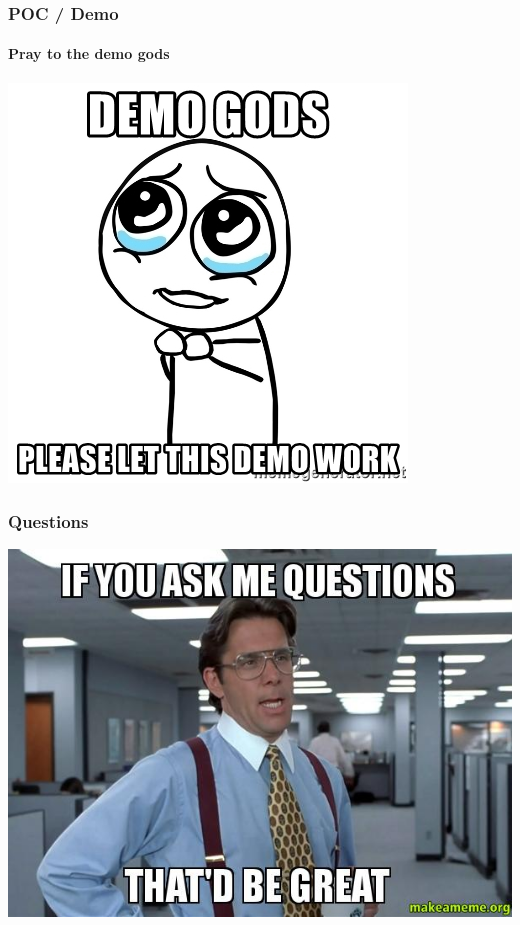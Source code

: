 \documentclass[aspectratio=169]{beamer}
\begin{document}
\begin{frame}
  \frametitle{POC / Demo}
  \framesubtitle{Pray to the demo gods}
  \begin{center}
    \includegraphics[scale=0.4]{demogods}
  \end{center}
\end{frame}
\begin{frame}
  \frametitle{Questions}
  \begin{center}
    \includegraphics[scale=0.3]{questions}
  \end{center}
\end{frame}
\end{document}
